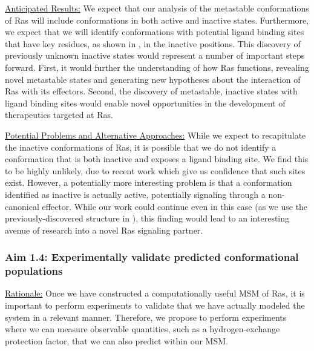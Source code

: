 \documentclass[12pt]{article}
\begin{document}
  \underline{Anticipated Results:} We expect that our analysis of the metastable conformations of Ras will include conformations in both active and inactive states. Furthermore, we expect that we will identify conformations with potential ligand binding sites that have key residues, as shown in , in the inactive positions. This discovery of previously unknown inactive states would represent a number of important steps forward. First, it would further the understanding of how Ras functions, revealing novel metastable states and generating new hypotheses about the interaction of Ras with its effectors. Second, the discovery of metastable, inactive states with ligand binding sites would enable novel opportunities in the development of therapeutics targeted at Ras.
  
  \underline{Potential Problems and Alternative Approaches:} While we expect to recapitulate the inactive conformations of Ras, it is possible that we do not identify a conformation that is both inactive and exposes a ligand binding site. We find this to be highly unlikely, due to recent work \cite{ostrem2013} \cite{fesik} which give us confidence that such sites exist. However, a potentially more interesting problem is that a conformation identified as inactive is actually active, potentially signaling through a non-canonical effector. While our work could continue even in this case (as we use the previously-discovered structure in \cite{ostrem2013}), this finding would lead to an interesting avenue of research into a novel Ras signaling partner.
    
  \subsubsection*{Aim 1.4: Experimentally validate predicted conformational populations}
  
  \underline{Rationale:} Once we have constructed a computationally useful MSM of Ras, it is important to perform experiments to validate that we have actually modeled the system in a relevant manner. Therefore, we propose to perform experiments where we can measure observable quantities, such as a hydrogen-exchange protection factor, that we can also predict within our MSM. 
\end{document}
